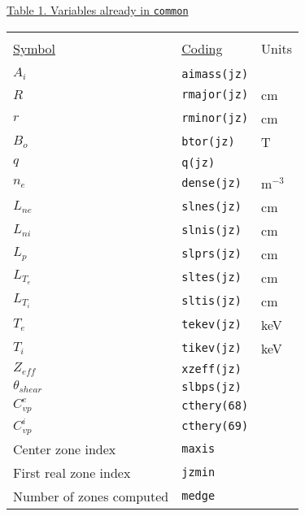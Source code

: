 \begin{table}
\begin{center}
\underline{Table 1.  Variables already in {\tt common}}
\end{center}
\begin{tabular}{lll}
                   &                      &           \\
\underline{Symbol} & \underline{Coding}   & Units     \\
                   &                      &           \\
$A_{i}$            & {\tt aimass(jz)}     &           \\
$R$                & {\tt rmajor(jz)}     & cm         \\
$r$                & {\tt rminor(jz)}     & cm         \\
$B_{o}$            & {\tt btor(jz)}       & T         \\
$q$                & {\tt q(jz)}          &           \\
$n_{e}$            & {\tt dense(jz)}      & m$^{-3}$  \\
$L_{ne}$           & {\tt slnes(jz)}      & cm         \\
$L_{ni}$           & {\tt slnis(jz)}      & cm         \\
$L_{p}$            & {\tt slprs(jz)}      & cm         \\
$L_{T_{e}}$        & {\tt sltes(jz)}      & cm         \\
$L_{T_{i}}$        & {\tt sltis(jz)}      & cm         \\
$T_{e}$            & {\tt tekev(jz)}      & keV        \\
$T_{i}$            & {\tt tikev(jz)}      & keV       \\
$Z_{eff}$          & {\tt xzeff(jz)}      &           \\
$\theta_{shear}$   & {\tt slbps(jz)}      &           \\
$C_{vp}^{e}$       & {\tt cthery(68)}     &           \\
$C_{vp}^{i}$       & {\tt cthery(69)}     &           \\
Center zone index        & {\tt maxis}    &       \\
First real zone index    & {\tt jzmin}    &       \\
Number of zones computed & {\tt medge}    &
\end{tabular}
\end{table}


